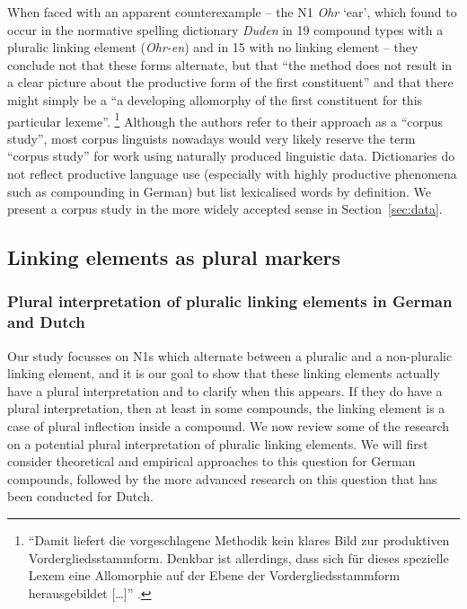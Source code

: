 When faced with an apparent counterexample -- the N1 \textit{Ohr} `ear', which \citet[42]{NeefBorgwaldt2012} found to occur in the normative spelling dictionary \textit{Duden} \citep{Duden2006} in 19 compound types with a pluralic linking element (\textit{Ohr-en}) and in 15 with no linking element -- they conclude not that these forms alternate, but that ``the method does not result in a clear picture about the productive form of the first constituent'' and that there might simply be a ``a developing allomorphy of the first constituent for this particular lexeme''.%
\footnote{``Damit liefert die vorgeschlagene Methodik kein klares Bild zur produktiven Vordergliedsstammform.
Denkbar ist allerdings, dass sich für dieses spezielle Lexem eine Allomorphie auf der Ebene der Vordergliedsstammform herausgebildet [\ldots]'' \citep[31]{NeefBorgwaldt2012}.}
Although the authors refer to their approach as a ``corpus study'', most corpus linguists nowadays would very likely reserve the term ``corpus study'' for work using naturally produced linguistic data.
Dictionaries do not reflect productive language use (especially with highly productive phenomena such as compounding in German) but list lexicalised words by definition.
We present a corpus study in the more widely accepted sense in Section~\ref{sec:data}.


\subsection{Linking elements as plural markers}
\label{sec:linkagesaspluralmarkers}

\subsubsection{Plural interpretation of pluralic linking elements in German and Dutch}
\label{sec:pluralinterpretationofpluraliclinkagesingermananddutch}

Our study focusses on N1s which alternate between a pluralic and a non-pluralic linking element, and it is our goal to show that these linking elements actually have a plural interpretation and to clarify when this appears.
If they do have a plural interpretation, then at least in some compounds, the linking element is a case of plural inflection inside a compound.
We now review some of the research on a potential plural interpretation of pluralic linking elements.
We will first consider theoretical and empirical approaches to this question for German compounds, followed by the more advanced research on this question that has been conducted for Dutch.

